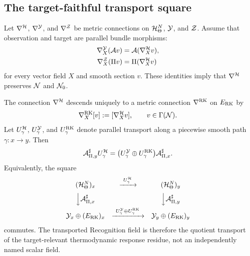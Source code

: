 \subsection{The target-faithful transport square}

Let $\nabla^{\mathcal H}$, $\nabla^{\mathcal Y}$, and $\nabla^{\mathcal Z}$ be metric connections on $\mathcal H^N_\Theta$, $\mathcal Y$, and $\mathcal Z$.  Assume that observation and target are parallel bundle morphisms:
\begin{align}
\nabla^{\mathcal Y}_X(\mathcal A v)&=\mathcal A(\nabla^{\mathcal H}_Xv),
\label{eq:observation-parallel}\\
\nabla^{\mathcal Z}_X(\Pi v)&=\Pi(\nabla^{\mathcal H}_Xv)
\label{eq:target-parallel}
\end{align}
for every vector field $X$ and smooth section $v$.  These identities imply that $\nabla^{\mathcal H}$ preserves $\mathcal N$ and $\mathcal N_0$.

\begin{theorem}
\label{thm:target-faithful-square}
The connection $\nabla^{\mathcal H}$ descends uniquely to a metric connection $\nabla^{\mathrm{RK}}$ on $E_{\mathrm{RK}}$ by
\begin{equation}
\nabla_X^{\mathrm{RK}}[v]
:=[\nabla_X^{\mathcal H}v],
\qquad v\in\Gamma(\mathcal N).
\label{eq:quotient-connection}
\end{equation}
Let $U_\gamma^{\mathcal H}$, $U_\gamma^{\mathcal Y}$, and $U_\gamma^{\mathrm{RK}}$ denote parallel transport along a piecewise smooth path $\gamma:x\to y$.  Then
\begin{equation}
\mathcal A_{\Pi,y}^\sharp U_\gamma^{\mathcal H}
=
\bigl(U_\gamma^{\mathcal Y}\oplus U_\gamma^{\mathrm{RK}}\bigr)
\mathcal A_{\Pi,x}^\sharp.
\label{eq:target-faithful-square}
\end{equation}
Equivalently, the square
\[
\begin{array}{ccc}
(\mathcal H^N_\Theta)_x & \xrightarrow{\ U_\gamma^{\mathcal H}\ } & (\mathcal H^N_\Theta)_y\\[2mm]
\Big\downarrow{\mathcal A_{\Pi,x}^\sharp} &&
\Big\downarrow{\mathcal A_{\Pi,y}^\sharp}\\[2mm]
\mathcal Y_x\oplus(E_{\mathrm{RK}})_x &
\xrightarrow{\ U_\gamma^{\mathcal Y}\oplus U_\gamma^{\mathrm{RK}}\ } &
\mathcal Y_y\oplus(E_{\mathrm{RK}})_y
\end{array}
\]
commutes.  The transported Recognition field is therefore the quotient transport of the target-relevant thermodynamic response residue, not an independently named scalar field.
\end{theorem}

